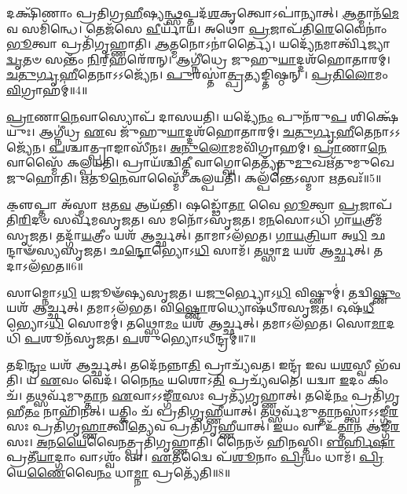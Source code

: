 𑌦𑌕𑍍𑌷𑌿᳴𑌣𑌾𑌂 𑌪𑍍𑌰𑌤𑌿𑌗𑍍𑌰\-\ul{𑌹𑍀}\-𑌷𑍍𑌯\-\ul{𑌨𑍍𑌥𑍍𑌸}\-𑌪𑍍𑌤𑌦᳴\-\ul{𑌶}\-𑌕𑍃𑌤𑍍𑌵𑍋\-𑌽𑌪𑌾॑𑌨𑍍𑌯𑌾𑌤𑍍।
\-\ul{𑌆}\-𑌤𑍍𑌮𑌾𑌨᳴\-\ul{𑌮𑍇}\-𑌵 𑌸𑌮𑌿᳴𑌨𑍍𑌧𑍇।
𑌤𑍇𑌜᳴𑌸𑍇 \ul{𑌵𑍀}\-𑌰𑍍𑌯𑌾᳴𑌯।
𑌅𑌥𑍋॑ \ul{𑌪𑍍𑌰}\-𑌜𑌾𑌪᳴𑌤𑌿\-\ul{𑌰𑍇}\-𑌵𑍈𑌨𑌾𑌂॑ \ul{𑌭𑍂}\-𑌤𑍍𑌵𑌾 𑌪𑍍𑌰𑌤𑌿᳴\-𑌗𑍃𑌹𑍍𑌣𑌾𑌤𑌿।
\-\ul{𑌆}\-𑌤𑍍𑌮𑌨𑍋\-𑌽𑌨𑌾॑𑌰𑍍𑌤𑍍𑌯𑍈।
𑌯𑌦𑍍𑌯𑍇᳴\-\ul{𑌨}\-𑌮𑌾𑌰𑍍𑌤𑍍𑌵𑌿᳴𑌜𑍍𑌯𑌾\-\ul{𑌦𑍍𑌵𑍃}\-𑌤𑍞 𑌸𑌨𑍍𑌤𑌂᳴ \ul{𑌨𑌿}\-𑌰𑍍‌॒\mbox{}𑌹𑌰𑍇᳴𑌰𑌨𑍍।
𑌆𑌗𑍍𑌨𑍀॑𑌧𑍍𑌰𑍇 𑌜𑍁𑌹𑍁\-\ul{𑌯𑌾}\-𑌦𑍍𑌦𑌶᳴𑌹𑍋𑌤𑌾𑌰𑌮𑍍।
\-\ul{𑌚}\-\-\ul{𑌤𑍁}\-\-\ul{𑌰𑍍𑌗𑍃}\-\-\ul{𑌹𑍀}\-𑌤𑍇𑌨𑌾𑌽𑌽𑌜𑍍𑌯𑍇᳴𑌨।
\-\ul{𑌪𑍁}\-𑌰𑌸𑍍𑌤𑌾॑\-\ul{𑌤𑍍𑌪𑍍𑌰}\-𑌤𑍍𑌯𑌙𑍍𑌤𑌿𑌷𑍍𑌠𑌨𑍍।
\-\ul{𑌪𑍍𑌰}\-\-\ul{𑌤𑌿}\-\-\ul{𑌲𑍋}\-𑌮𑌂 \ul{𑌵𑌿}\-𑌗𑍍𑌰𑌾𑌹𑌮𑍍॑॥4॥

\-\ul{𑌪𑍍𑌰𑌾}\-𑌣𑌾\-\ul{𑌨𑍇}\-𑌵𑌾𑌸𑍍𑌯𑍋𑌪᳴ 𑌦𑌾𑌸𑌯𑌤𑌿।
𑌯𑌦𑍍𑌯𑍇᳴\-\ul{𑌨𑌂} 𑌪𑍁𑌨᳴𑌰𑍁\-\ul{𑌪} 𑌶𑌿𑌕𑍍𑌷𑍇᳴𑌯𑍁𑌃।
𑌆𑌗𑍍𑌨𑍀॑𑌧𑍍𑌰 \ul{𑌏}\-𑌵 𑌜𑍁᳴𑌹𑍁\-\ul{𑌯𑌾}\-𑌦𑍍𑌦𑌶᳴𑌹𑍋𑌤𑌾𑌰𑌮𑍍।
\-\ul{𑌚}\-\-\ul{𑌤𑍁}\-\-\ul{𑌰𑍍𑌗𑍃}\-\-\ul{𑌹𑍀}\-𑌤𑍇𑌨𑌾𑌽𑌽𑌜𑍍𑌯𑍇᳴𑌨।
\-\ul{𑌪}\-𑌶𑍍𑌚𑌾𑌤𑍍𑌪𑍍𑌰𑌾𑌙𑌾𑌸𑍀᳴𑌨𑌃।
\-\ul{𑌅}\-\-\ul{𑌨𑍁}\-\-\ul{𑌲𑍋}\-𑌮𑌮𑌵𑌿᳴𑌗𑍍𑌰𑌾𑌹𑌮𑍍।
\-\ul{𑌪𑍍𑌰𑌾}\-𑌣𑌾\-\ul{𑌨𑍇}\-𑌵𑌾𑌸𑍍𑌮𑍈᳴ 𑌕𑌲𑍍𑌪𑌯𑌤𑌿।
𑌪𑍍𑌰𑌾𑌯᳴𑌶𑍍𑌚𑌿\-\ul{𑌤𑍍𑌤𑍀} 𑌵𑌾𑌗𑍍𑌘𑍋𑌤𑍇𑌤𑍍𑌯𑍃᳴𑌤𑍁\-\ul{𑌮𑍁}\-𑌖𑌋᳴𑌤𑍁𑌮𑍁𑌖𑍇 𑌜𑍁𑌹𑍋𑌤𑌿।
\-\ul{𑌋}\-𑌤𑍂\-\ul{𑌨𑍇}\-𑌵𑌾𑌸𑍍𑌮𑍈᳴ 𑌕𑌲𑍍𑌪𑌯𑌤𑌿।
𑌕𑌲𑍍𑌪᳴𑌨𑍍𑌤𑍇\-𑌽𑌸𑍍𑌮𑌾 \ul{𑌋}\-𑌤𑌵𑌃᳴॥5॥

𑌕𑍢॒𑌪𑍍𑌤𑌾 𑌅᳴𑌸𑍍𑌮𑌾 \ul{𑌋}\-𑌤\-\ul{𑌵} 𑌆𑌯᳴𑌨𑍍𑌤𑌿।
𑌷𑌡𑍍𑌢𑍋᳴\-\ul{𑌤𑌾} 𑌵𑍈 \ul{𑌭𑍂}\-𑌤𑍍𑌵𑌾 \ul{𑌪𑍍𑌰}\-𑌜𑌾𑌪᳴𑌤𑌿\-\ul{𑌰𑌿}\-𑌦𑍞 𑌸𑌰𑍍𑌵᳴𑌮\-𑌸𑍃𑌜𑌤।
𑌸 𑌮𑌨𑍋᳴\-𑌽\-𑌸𑍃𑌜𑌤।
𑌮\-\ul{𑌨}\-𑌸𑍋𑌽𑌧𑌿᳴ 𑌗𑌾\-\ul{𑌯}\-𑌤𑍍𑌰𑍀𑌮᳴\-𑌸𑍃𑌜𑌤।
𑌤𑌦𑍍𑌗𑌾᳴\-\ul{𑌯}\-𑌤𑍍𑌰𑍀𑌂 𑌯𑌶᳴ 𑌆𑌰𑍍𑌚𑍍𑌛𑌤𑍍।
𑌤𑌾𑌮𑌾𑌽𑌲᳴𑌭𑌤।
\-\ul{𑌗𑌾}\-\-\ul{𑌯}\-\-\ul{𑌤𑍍𑌰𑌿}\-𑌯𑌾 𑌅\-\ul{𑌧𑌿} 𑌛𑌨𑍍𑌦𑌾𑍟᳴𑌸𑍍𑌯\-𑌸𑍃𑌜𑌤।
𑌛\-\ul{𑌨𑍍𑌦𑍋}\-𑌭𑍍𑌯𑍋𑌽\-\ul{𑌧𑌿} 𑌸𑌾𑌮᳴।
𑌤𑌥𑍍𑌸𑌾\-\ul{𑌮} 𑌯𑌶᳴ 𑌆𑌰𑍍𑌚𑍍𑌛𑌤𑍍।
𑌤𑌦𑌾𑌽𑌲᳴𑌭𑌤॥6॥

𑌸𑌾𑌮𑍍𑌨𑍋𑌽\-\ul{𑌧𑌿} 𑌯𑌜𑍂𑍟᳴𑌷𑍍𑌯\-𑌸𑍃𑌜𑌤।
𑌯\-\ul{𑌜𑍁}\-𑌰𑍍𑌭𑍍𑌯𑍋𑌽\-\ul{𑌧𑌿} 𑌵𑌿𑌷𑍍𑌣𑍁𑌮𑍍॑।
𑌤𑌦𑍍𑌵𑌿\-\ul{𑌷𑍍𑌣𑍁𑌂} 𑌯𑌶᳴ 𑌆𑌰𑍍𑌚𑍍𑌛𑌤𑍍।
𑌤𑌮𑌾𑌽𑌲᳴𑌭𑌤।
𑌵𑌿\-\ul{𑌷𑍍𑌣𑍋}\-𑌰𑌧𑍍𑌯𑍋𑌷᳴𑌧𑍀𑌰\-𑌸𑍃𑌜𑌤।
𑌓𑌷᳴\-\ul{𑌧𑍀}\-𑌭𑍍𑌯𑍋𑌽\-\ul{𑌧𑌿} 𑌸𑍋𑌮𑌮𑍍॑।
𑌤𑌥𑍍𑌸𑍋\-\ul{𑌮𑌂} 𑌯𑌶᳴ 𑌆𑌰𑍍𑌚𑍍𑌛𑌤𑍍।
𑌤𑌮𑌾𑌽𑌲᳴𑌭𑌤।
𑌸𑍋\-\ul{𑌮𑌾}\-𑌦𑌧𑌿᳴ \ul{𑌪}\-𑌶𑍂𑌨᳴\-𑌸𑍃𑌜𑌤।
\-\ul{𑌪}\-𑌶𑍁𑌭𑍍𑌯𑍋\-𑌽𑌧𑍀𑌨𑍍𑌦𑍍𑌰𑌮𑍍॑॥7॥

𑌤𑌦𑌿\-\ul{𑌨𑍍𑌦𑍍𑌰𑌂} 𑌯𑌶᳴ 𑌆𑌰𑍍𑌚𑍍𑌛𑌤𑍍।
𑌤𑌦𑍇᳴\-\ul{𑌨}\-𑌨𑍍𑌨𑌾\-\ul{𑌤𑌿} 𑌪𑍍𑌰𑌾𑌚𑍍𑌯᳴𑌵𑌤।
𑌇𑌨𑍍𑌦𑍍𑌰᳴ 𑌇𑌵 𑌯\-\ul{𑌶}\-𑌸𑍍𑌵𑍀 𑌭᳴𑌵𑌤𑌿।
𑌯 \ul{𑌏}\-𑌵𑌂 𑌵𑍇𑌦᳴।
𑌨𑍈\-\ul{𑌨𑌂} 𑌯𑌶𑍋𑌽\-\ul{𑌤𑌿} 𑌪𑍍𑌰𑌚𑍍𑌯᳴𑌵𑌤𑍇।
𑌯𑌦𑍍𑌵𑌾 \ul{𑌇}\-𑌦𑌂 𑌕𑌿𑌂 𑌚᳴।
𑌤𑌥𑍍𑌸𑌰𑍍𑌵᳴𑌮𑍁\-\ul{𑌤𑍍𑌤𑌾}\-𑌨 \ul{𑌏}\-𑌵𑌾\-𑌽𑌽𑌙𑍍𑌗𑍀᳴\-\ul{𑌰}\-𑌸𑌃 𑌪𑍍𑌰𑌤𑍍𑌯᳴𑌗𑍃𑌹𑍍𑌣𑌾𑌤𑍍।
𑌤𑌦𑍇᳴\-\ul{𑌨𑌂} 𑌪𑍍𑌰𑌤𑌿᳴\-𑌗𑍃𑌹𑍀\-\ul{𑌤𑌂} 𑌨𑌾𑌹𑌿᳴𑌨𑌤𑍍।
𑌯𑌤𑍍𑌕𑌿𑌂 𑌚᳴ 𑌪𑍍𑌰𑌤𑌿𑌗𑍃\-\ul{𑌹𑍍𑌣𑍀}\-𑌯𑌾𑌤𑍍।
𑌤𑌥𑍍𑌸𑌰𑍍𑌵᳴𑌮𑍁\-\ul{𑌤𑍍𑌤𑌾}\-𑌨𑌸𑍍𑌤𑍍𑌵𑌾॑\-𑌽𑌽𑌙𑍍𑌗𑍀\-\ul{𑌰}\-𑌸𑌃 𑌪𑍍𑌰𑌤𑌿᳴\-𑌗𑍃\-\ul{𑌹𑍍𑌣𑌾}\-𑌤𑍍𑌵𑌿\-\ul{𑌤𑍍𑌯𑍇}\-𑌵 𑌪𑍍𑌰𑌤𑌿᳴\-𑌗𑍃𑌹𑍍𑌣𑍀𑌯𑌾𑌤𑍍।
\-\ul{𑌇}\-𑌯𑌂 𑌵𑌾 𑌉᳴\-\ul{𑌤𑍍𑌤𑌾}\-𑌨 𑌆॑𑌙𑍍𑌗𑍀\-\ul{𑌰}\-𑌸𑌃।
\-\ul{𑌅}\-𑌨\-\ul{𑌯𑍈}\-𑌵𑍈\-\ul{𑌨}\-𑌤𑍍𑌪𑍍𑌰𑌤𑌿᳴\-𑌗𑍃𑌹𑍍𑌣𑌾𑌤𑌿।
𑌨𑍈𑌨𑍞᳴ 𑌹𑌿𑌨𑌸𑍍𑌤𑌿।
\-\ul{𑌬}\-\-\ul{𑌰𑍍}\-𑌹𑌿\-\ul{𑌷𑌾} 𑌪𑍍𑌰𑌤𑍀᳴\-\ul{𑌯𑌾}\-𑌦𑍍𑌗𑌾𑌂 𑌵𑌾𑌽𑌶𑍍𑌵𑌂᳴ 𑌵𑌾।
\-\ul{𑌏}\-𑌤𑌦𑍍𑌵𑍈 𑌪᳴\-\ul{𑌶𑍂}\-𑌨𑌾𑌂 \ul{𑌪𑍍𑌰𑌿}\-𑌯𑌂 𑌧𑌾𑌮᳴।
\-\ul{𑌪𑍍𑌰𑌿}\-𑌯𑍇\-\ul{𑌣𑍈}\-𑌵𑍈\-\ul{𑌨𑌂} 𑌧𑌾\-\ul{𑌮𑍍𑌨𑌾} 𑌪𑍍𑌰𑌤𑍍𑌯𑍇᳴𑌤𑌿॥8॥\anuvakamend[\-\ul{𑌵𑌿}\-𑌗𑍍𑌰𑌾𑌹᳴\-\ul{𑌮𑍃}\-𑌤\-\ul{𑌵}\-𑌸𑍍𑌤𑌦𑌾\-𑌽𑌲᳴\-\ul{𑌭}\-𑌤𑍇𑌨𑍍𑌦𑍍𑌰𑌂᳴ 𑌗𑍃𑌹𑍍𑌣𑍀\-\ul{𑌯𑌾}\-𑌥𑍍𑌷𑌟𑍍𑌚᳴]

